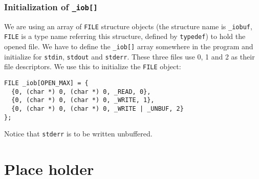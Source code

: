 \documentclass[11pt]{article}
\begin{document}
\subsubsection{Initialization of \texttt{\_iob[]}}
\label{sec:orgd6eff7c}
We are using an array of \texttt{FILE} structure objects (the structure name is \texttt{\_iobuf}, \texttt{FILE} is a type name referring this structure, defined by \texttt{typedef}) to hold the opened file. We have to define the \texttt{\_iob[]} array somewhere in the program and initialize for \texttt{stdin}, \texttt{stdout} and \texttt{stderr}. These three files use 0, 1 and 2 as their file descriptors. We use this to initialize the \texttt{FILE} object:
\begin{verbatim}
FILE _iob[OPEN_MAX] = {
  {0, (char *) 0, (char *) 0, _READ, 0},
  {0, (char *) 0, (char *) 0, _WRITE, 1},
  {0, (char *) 0, (char *) 0, _WRITE | _UNBUF, 2}
};
\end{verbatim}

Notice that \texttt{stderr} is to be written unbuffered.

\section{Place holder}
\label{sec:orgdd161ec}
\end{document}
